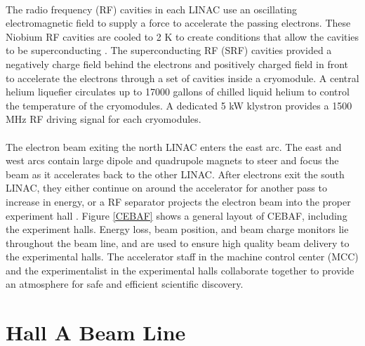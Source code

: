 	\paragraph{}The radio frequency (RF) cavities in each LINAC use an oscillating electromagnetic field to supply a force to accelerate the passing electrons. These Niobium RF cavities are cooled to 2 K to create conditions that allow the cavities to be superconducting \cite{HallA}. The superconducting RF (SRF) cavities provided a negatively charge field behind the electrons and positively charged field in front to accelerate the electrons through a set of cavities inside a cryomodule. A central helium liquefier circulates up to 17000 gallons of chilled liquid helium to control the temperature of the cryomodules. A dedicated 5 kW klystron  provides a 1500 MHz RF driving signal for each cryomodules. 
	\paragraph{} The electron beam exiting the north LINAC enters the east arc. The east and west arcs contain large dipole and quadrupole magnets to steer and focus the beam as it accelerates back to the other LINAC. After electrons exit the south LINAC, they either continue on around the accelerator for another pass to increase in energy, or a RF separator projects the electron beam into the proper experiment hall \cite{CEBAF}. Figure \ref{CEBAF} shows a general layout of CEBAF, including the experiment halls. Energy loss, beam position, and beam charge monitors lie throughout the beam line, and are used to ensure high quality beam delivery to the experimental halls. The accelerator staff in the machine control center (MCC) and the experimentalist in the experimental halls collaborate together to provide an atmosphere for safe and efficient scientific discovery.

 \section{Hall A Beam Line}\label{sec:halla}
	 
	 
